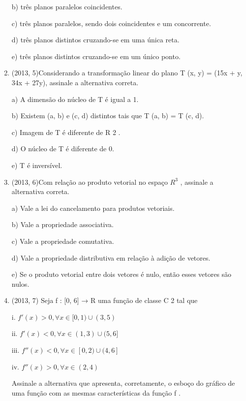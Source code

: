 \documentclass{article}
\begin{document}
\begin{enumerate}
b) três planos paralelos coincidentes.

c) três planos paralelos, sendo dois coincidentes e um concorrente.

d) três planos distintos cruzando-se em uma única reta.

e) três planos distintos cruzando-se em um único ponto.\newline




\item(2013, 5)Considerando a transformação linear do plano T (x, y) = (15x + y, 34x + 27y), assinale a alternativa correta.

a) A dimensão do núcleo de T é igual a 1.

b) Existem (a, b) e (c, d) distintos tais que T (a, b) = T (c, d).

c) Imagem de T é diferente de R 2 .

d) O núcleo de T é diferente de 0.

e) T é inversível.\newline





\item(2013, 6)Com relação ao produto vetorial no espaço $R^3$ , assinale a alternativa correta.

a) Vale a lei do cancelamento para produtos vetoriais.

b) Vale a propriedade associativa.

c) Vale a propriedade comutativa.

d) Vale a propriedade distributiva em relação à adição de vetores.

e) Se o produto vetorial entre dois vetores é nulo, então esses vetores são nulos.\newline





\item(2013, 7) Seja f : [0, 6] → R uma função de classe C 2 tal que

i. $f' (x) > 0, \forall x \in [0, 1) \cup (3, 5)$

ii. $f' (x) < 0, \forall x \in (1, 3) \cup (5, 6]$

iii. $f'' (x) < 0, \forall x \in [0, 2) \cup (4, 6]$

iv. $f'' (x) > 0, \forall x \in (2, 4)$

Assinale a alternativa que apresenta, corretamente, o esboço do gráfico de uma função com as mesmas
características da função f .



\end{enumerate}
\end{document}
